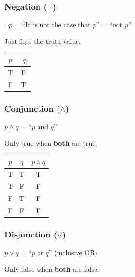 \documentclass[11pt,a4paper]{article}
\begin{document}
\subsubsection{Negation ($\neg$)}

\begin{definitionbox}[Negation]
$\neg p$ = ``It is not the case that $p$'' = ``not $p$''

Just flips the truth value.
\end{definitionbox}

\begin{center}
\begin{tabular}{c|c}
\toprule
$p$ & $\neg p$ \\
\midrule
T & F \\
F & T \\
\bottomrule
\end{tabular}
\end{center}

\subsubsection{Conjunction ($\land$)}

\begin{definitionbox}[Conjunction]
$p \land q$ = ``$p$ and $q$''

Only true when \textbf{both} are true.
\end{definitionbox}

\begin{center}
\begin{tabular}{cc|c}
\toprule
$p$ & $q$ & $p \land q$ \\
\midrule
T & T & T \\
T & F & F \\
F & T & F \\
F & F & F \\
\bottomrule
\end{tabular}
\end{center}

\subsubsection{Disjunction ($\lor$)}

\begin{definitionbox}[Disjunction]
$p \lor q$ = ``$p$ or $q$'' (inclusive OR)

Only false when \textbf{both} are false.
\end{definitionbox}
\end{document}
